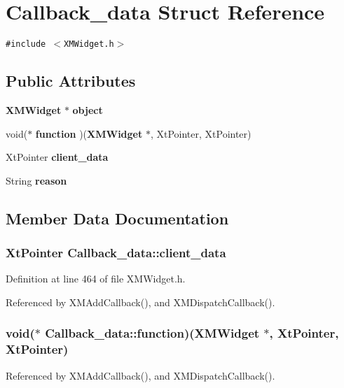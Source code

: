 \section{Callback\_\-data  Struct Reference}
\label{structCallback__data}
{\tt \#include $<$XMWidget.h$>$}

\subsection*{Public Attributes}
\begin{CompactItemize}
\item 
{\bf XMWidget} $\ast$ {\bf object}
\item 
void($\ast$ {\bf function} )({\bf XMWidget} $\ast$, Xt\-Pointer, Xt\-Pointer)
\item 
Xt\-Pointer {\bf client\_\-data}
\item 
String {\bf reason}
\end{CompactItemize}


\subsection{Member Data Documentation}
\subsubsection{\setlength{\rightskip}{0pt plus 5cm}Xt\-Pointer Callback\_\-data::client\_\-data}\label{structCallback__data_m2}




Definition at line 464 of file XMWidget.h.

Referenced by XMAdd\-Callback(), and XMDispatch\-Callback().
\subsubsection{\setlength{\rightskip}{0pt plus 5cm}void($\ast$ Callback\_\-data::function)({\bf XMWidget} $\ast$, Xt\-Pointer, Xt\-Pointer)}\label{structCallback__data_m1}




Referenced by XMAdd\-Callback(), and XMDispatch\-Callback().
